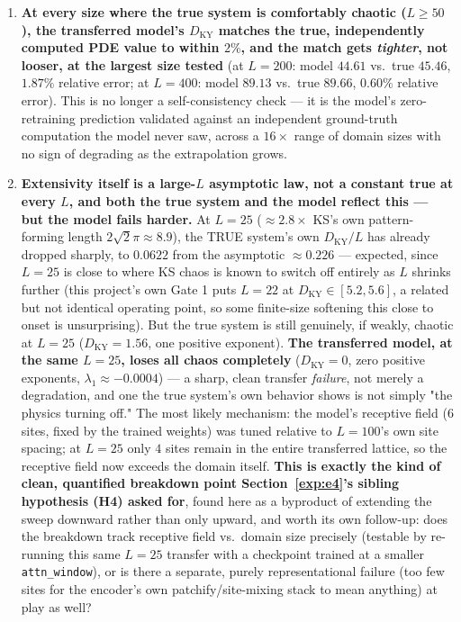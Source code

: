 \documentclass[11pt]{article}
\begin{document}
\begin{enumerate}[nosep]
\item \textbf{At every size where the true system is comfortably
  chaotic ($L\geq50$), the transferred model's $D_{\mathrm{KY}}$
  matches the true, independently computed PDE value to within
  $2\%$, and the match gets \emph{tighter}, not looser, at the
  largest size tested} (at $L=200$: model $44.61$ vs.\ true $45.46$,
  $1.87\%$ relative error; at $L=400$: model $89.13$ vs.\ true
  $89.66$, $0.60\%$ relative error). This is no longer a
  self-consistency check --- it is the model's zero-retraining
  prediction validated against an independent ground-truth
  computation the model never saw, across a $16\times$ range of
  domain sizes with no sign of degrading as the extrapolation grows.
\item \textbf{Extensivity itself is a large-$L$ asymptotic law, not a
  constant true at every $L$, and both the true system and the model
  reflect this --- but the model fails harder.} At $L=25$
  ($\approx 2.8\times$ KS's own pattern-forming length
  $2\sqrt2\pi\approx8.9$), the TRUE system's own
  $D_{\mathrm{KY}}/L$ has already dropped sharply, to $0.0622$ from the
  asymptotic $\approx0.226$ --- expected, since $L=25$ is close to
  where KS chaos is known to switch off entirely as $L$ shrinks
  further (this project's own Gate 1 puts $L=22$ at $D_{\mathrm{KY}}
  \in[5.2,5.6]$, a related but not identical operating point, so some
  finite-size softening this close to onset is unsurprising). But the
  true system is still genuinely, if weakly, chaotic at $L=25$
  ($D_{\mathrm{KY}}=1.56$, one positive exponent). \textbf{The
  transferred model, at the same $L=25$, loses all chaos completely}
  ($D_{\mathrm{KY}}=0$, zero positive exponents, $\lambda_1\approx
  -0.0004$) --- a sharp, clean transfer \emph{failure}, not merely a
  degradation, and one the true system's own behavior shows is not
  simply "the physics turning off." The most likely mechanism: the
  model's receptive field ($6$ sites, fixed by the trained weights) was
  tuned relative to $L=100$'s own site spacing; at $L=25$ only $4$
  sites remain in the entire transferred lattice, so the receptive
  field now exceeds the domain itself. \textbf{This is exactly the
  kind of clean, quantified breakdown point Section~\ref{exp:e4}'s
  sibling hypothesis (H4) asked for}, found here as a byproduct of
  extending the sweep downward rather than only upward, and worth its
  own follow-up: does the breakdown track receptive field vs.\ domain
  size precisely (testable by re-running this same $L=25$ transfer with
  a checkpoint trained at a smaller \texttt{attn\_window}), or is there
  a separate, purely representational failure (too few sites for the
  encoder's own patchify/site-mixing stack to mean anything) at play as
  well?
\end{enumerate}
\end{document}
